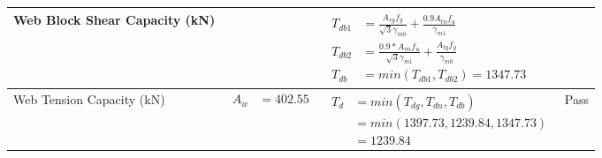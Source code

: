 \documentclass{article}%
\begin{document}
\begin{longtable}{|p{4cm}|p{6cm}|p{5.5cm}|p{1.5cm}|}
\hline%
Web Block Shear Capacity (kN)&&$\begin{aligned}T_{db1} &= \frac{A_{vg} f_{y}}{\sqrt{3} \gamma_{m0}} + \frac{0.9 A_{tn} f_{u}}{\gamma_{m1}}\\ T_{db2} &= \frac{0.9*A_{vn} f_{u}}{\sqrt{3} \gamma_{m1}} + \frac{A_{tg} f_{y}}{\gamma_{m0}}\\ T_{db} &= min(T_{db1}, T_{db2})= 1347.73\end{aligned}$&\\%
\hline%
Web Tension Capacity (kN)&$\begin{aligned} A_w &=402.55\end{aligned}$&$\begin{aligned} T_d &= min(T_{dg},T_{dn},T_{db})\\ &= min(1397.73,1239.84,1347.73)\\ &=1239.84\end{aligned}$&Pass\\%
\hline%
\end{longtable}

%
\newpage%
\end{document}
